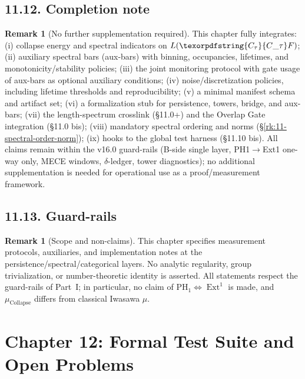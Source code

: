 \documentclass[11pt]{article}
\numberwithin{equation}{section}
\theoremstyle{plain}
\theoremstyle{definition}
\theoremstyle{remark}
\DeclareMathOperator{\Ext}{Ext}
\theoremstyle{plain}
\theoremstyle{definition}
\numberwithin{equation}{section}
\theoremstyle{definition}
\newtheorem{remark}[theorem]{Remark}
\DeclareRobustCommand{\Ctau}{\texorpdfstring{\ensuremath{C_{\tau}}}{C\_\tau}}
\DeclareRobustCommand{\muc}{\mu_{\mathrm{Collapse}}}
\numberwithin{equation}{section}
\theoremstyle{plain}
\theoremstyle{definition}
\theoremstyle{remark}
\providecommand{\Cfun}[1]{\mathsf{C}_{#1}}
\providecommand{\Ctau}{\Cfun{\tau}}
\providecommand{\muc}{\mu_{\mathrm{Collapse}}}
\begin{document}
\subsection*{11.12. Completion note}
\begin{remark}[No further supplementation required]
This chapter fully integrates: (i) collapse energy and spectral indicators on $L(\Ctau F)$; (ii) auxiliary spectral bars (aux-bars) with binning, occupancies, lifetimes, and monotonicity/stability policies; (iii) the joint monitoring protocol with gate usage of aux-bars as optional auxiliary conditions; (iv) noise/discretization policies, including lifetime thresholds and reproducibility; (v) a minimal manifest schema and artifact set; (vi) a formalization stub for persistence, towers, bridge, and aux-bars; (vii) the length-spectrum crosslink (\S11.0+) and the Overlap Gate integration (\S11.0 bis); (viii) mandatory spectral ordering and norms (\S\ref{rk:11-spectral-order-norm}); (ix) hooks to the global test harness (\S11.10 bis). All claims remain within the v16.0 guard-rails (B-side single layer, PH1$\to$Ext1 one-way only, MECE windows, $\delta$-ledger, tower diagnostics); no additional supplementation is needed for operational use as a proof/measurement framework.
\end{remark}

\subsection*{11.13. Guard-rails}
\begin{remark}[Scope and non-claims]\label{rk:11-guard}
This chapter specifies measurement protocols, auxiliaries, and implementation notes at the persistence/spectral/categorical layers. No analytic regularity, group trivialization, or number-theoretic identity is asserted. All statements respect the guard-rails of Part~I; in particular, no claim of $\mathrm{PH}_1\Leftrightarrow \Ext^1$ is made, and $\muc$ differs from classical Iwasawa $\mu$.
\end{remark}



\section{Chapter 12: Formal Test Suite and Open Problems}
\end{document}
